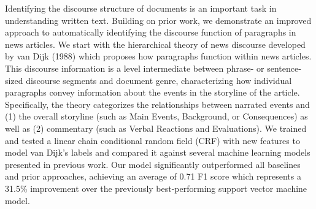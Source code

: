 Identifying the discourse structure of documents is an important task in understanding written text. Building on prior work, we demonstrate an improved approach to automatically identifying the discourse function of paragraphs in news articles. We start with the hierarchical theory of news discourse developed by van Dijk (1988) which proposes how paragraphs function within news articles. This discourse information is a level intermediate between phrase- or sentence-sized discourse segments and document genre, characterizing how individual paragraphs convey information about the events in the storyline of the article. Specifically, the theory categorizes the relationships between narrated events and (1) the overall storyline (such as Main Events, Background, or Consequences) as well as (2) commentary (such as Verbal Reactions and Evaluations). We trained and tested a linear chain conditional random field (CRF) with new features to model van Dijk's labels and compared it against several machine learning models presented in previous work. Our model significantly outperformed all baselines and prior approaches, achieving an average of 0.71 F1 score which represents a 31.5\% improvement over the previously best-performing support vector machine model.
